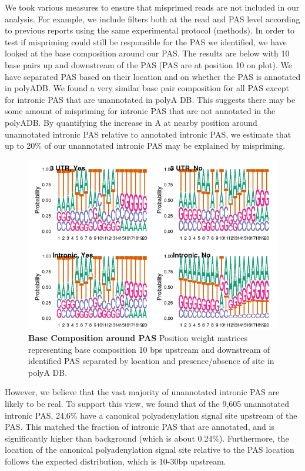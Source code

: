 We took various measures to ensure that misprimed reads are not included in our analysis. For example, we include filters both at the read and PAS level according to previous reports using the same experimental protocol (methods). In order to test if mispriming could still be responsible for the PAS we identified, we have looked at the base composition around our PAS. The results are below with 10 base pairs up and downstream of the PAS (PAS are at position 10 on plot). We have separated PAS based on their location and on whether the PAS is annotated in polyADB. We found a very similar base pair composition for all PAS except for intronic PAS that are unannotated in polyA DB. This suggests there may be some amount of mispriming for intronic PAS that are not annotated in the polyADB. By quantifying the increase in A at nearby position around unannotated intronic PAS relative to annotated intronic PAS, we estimate that up to 20\% of our unannotated intronic PAS may be explained by mispriming. 


\begin{figure}
\centering \includegraphics[width=5in]{img/ch02/figureAppendix6.png}
\caption[Base Composition around PAS]{\textbf{Base Composition around PAS} Position weight matrices representing base composition 10 bps upstream and downstream of identified PAS separated by location and presence/absence of site in polyA DB.}
\label{fig:Supplementaryfile1-Fig6}
\end{figure} 


However, we believe that the vast majority of unannotated intronic PAS are likely to be real. To support this view, we found that of the 9,605 unannotated intronic PAS, 24.6\% have a canonical polyadenylation signal site upstream of the PAS. This matched the fraction of intronic PAS that are annotated, and is significantly higher than background (which is about 0.24\%). Furthermore, the location of the canonical polyadenylation signal site relative to the PAS location follows the expected distribution, which is 10-30bp upstream.   


